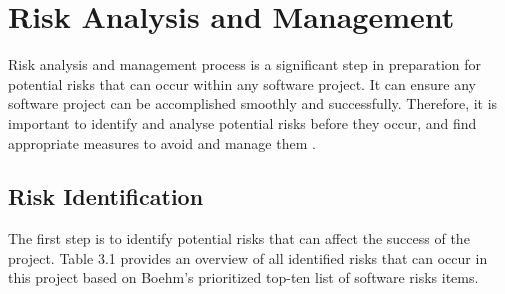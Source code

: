 \section{Risk Analysis and Management}

Risk analysis and management process is a significant step in preparation for potential risks that can occur within any software project. It can ensure any software project can be accomplished smoothly and successfully. Therefore, it is important to identify and analyse potential risks before they occur, and find appropriate measures to avoid and manage them \cite{boehm1991software}.


\subsection{Risk Identification}

The first step is to identify potential risks that can affect the success of the project. Table 3.1 provides an overview of all identified risks that can occur in this project based on Boehm's \cite{boehm1991software} prioritized top-ten list of software risks items.


